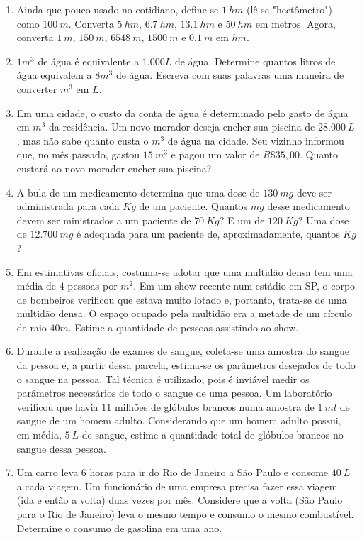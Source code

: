 \documentclass[12pt]{report}
\newcommand{\1}{\faThermometerEmpty}
\newcommand{\2}{\faThermometerQuarter}
\newcommand{\3}{\faThermometerHalf}
\newcommand{\4}{\faThermometerThreeQuarters}
\newcommand{\5}{\faThermometerFull}
\begin{document}
\begin{enumerate}
\begin{enumerate}
\item Ainda que pouco usado no cotidiano, define-se $1\ hm$ (lê-se "hectômetro") como $100\ m$. Converta $5\ hm$, $6.7\ hm$, $13.1\ hm$ e $50\ hm$ em metros. Agora, converta $1\ m$, $150\ m$, $6548\ m$, $1500\ m$ e $0.1\ m$ em $hm$.
\item $1m^3$ de água é equivalente a $1.000L$ de água. Determine quantos litros de água equivalem a $8m^3$ de água. Escreva com suas palavras uma maneira de converter $m^3$ em $L$.
\item Em uma cidade, o custo da conta de água é determinado pelo gasto de água em $m^3$ da residência. Um novo morador deseja encher sua piscina de $28.000\ L$, mas não sabe quanto custa o $m^3$ de água na cidade. Seu vizinho informou que, no mês passado, gastou $15\ m^3$ e pagou um valor de $R\$35,00$. Quanto custará ao novo morador encher sua piscina?
\item A bula de um medicamento determina que uma dose de $130\ mg$ deve ser administrada para cada $Kg$ de um paciente. Quantos $mg$ desse medicamento devem ser ministrados a um paciente de $70\ Kg$? E um de $120\ Kg$? Uma dose de $12.700\ mg$ é adequada para um paciente de, aproximadamente, quantos $Kg$?
\item Em estimativas oficiais, costuma-se adotar que uma multidão densa tem uma média de $4$ pessoas por $m^2$. Em um show recente num estádio em SP, o corpo de bombeiros verificou que estava muito lotado e, portanto, trata-se de uma multidão densa. O espaço ocupado pela multidão era a metade de um círculo de raio $40m$. Estime a quantidade de pessoas assistindo ao show.
\item Durante a realização de exames de sangue, coleta-se uma amostra do sangue da pessoa e, a partir dessa parcela, estima-se os parâmetros desejados de todo o sangue na pessoa. Tal técnica é utilizado, pois é inviável medir os parâmetros necessários de todo o sangue de uma pessoa. Um laboratório verificou que havia $11$ milhões de glóbulos brancos numa amostra de $1 \ ml$ de sangue de um homem adulto. Considerando que um homem adulto possui, em média, $5 \ L$ de sangue, estime a quantidade total de glóbulos brancos no sangue dessa pessoa.
\item Um carro leva $6$ horas para ir do Rio de Janeiro a São Paulo e consome $40\ L$ a cada viagem. Um funcionário de uma empresa precisa fazer essa viagem (ida e então a volta) duas vezes por mês. Considere que a volta (São Paulo para o Rio de Janeiro) leva o mesmo tempo e consumo o mesmo combustível. Determine o consumo de gasolina em uma ano.

\end{enumerate}
\end{enumerate}
\end{document}

